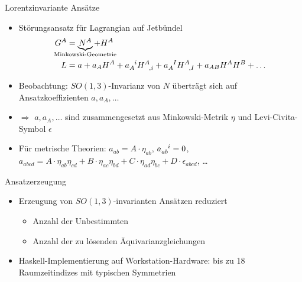 \documentclass{beamer}
\begin{document}
    \begin{frame}{Lorentzinvariante Ansätze}
        \begin{itemize}
            \item Störungsansatz für Lagrangian auf Jetbündel
            \begin{align*}
                G^A &= \underbrace{N^A}_{\mathclap{\text{Minkowski-Geometrie}}} + H^A \\
                L &= a + a_A H^A + a_A^{\hphantom Ai} H^A_{\hphantom{A},i} + a_A^{\hphantom AI} H^A_{\hphantom{A},I} + a_{AB} H^A H^B + \ldots
            \end{align*}
            \item Beobachtung: $SO(1,3)$-Invarianz von $N$ überträgt sich auf Ansatzkoeffizienten $a, a_A, \ldots$
            \item $\Rightarrow$ $a, a_A, \ldots$ sind zusammengesetzt aus
            Minkowski-Metrik $\eta$ und Levi-Civita-Symbol $\epsilon$
            \item Für metrische Theorien: $a_{ab} = A \cdot \eta_{ab}$, $a_{ab}^{\hphantom{ab}i} = 0$, $a_{abcd} = A\cdot \eta_{ab} \eta_{cd} + B\cdot \eta_{ac} \eta_{bd} + C\cdot \eta_{ad} \eta_{bc} + D \cdot \epsilon_{abcd}$, \ldots
        \end{itemize}
    \end{frame}

    \begin{frame}{Ansatzerzeugung}
        \begin{itemize}
            \item Erzeugung von $SO(1,3)$-invarianten Ansätzen reduziert
            \begin{itemize}
                \item Anzahl der Unbestimmten
                \item Anzahl der zu lösenden Äquivarianzgleichungen
            \end{itemize}
            \item Haskell-Implementierung auf Workstation-Hardware: bis zu 18 Raumzeitindizes mit typischen Symmetrien
        \end{itemize}
    \end{frame}
\end{document}
